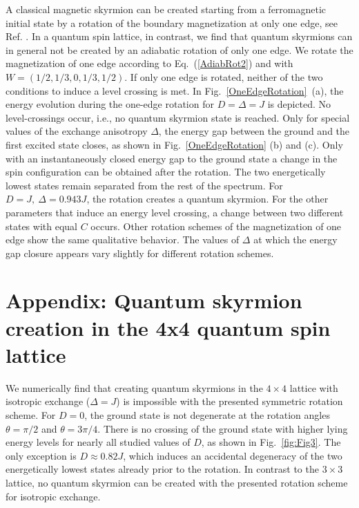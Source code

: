 \documentclass[reprint,aps,prb,superscriptaddress,10pt]{revtex4-2} %
\begin{document}
A classical magnetic skyrmion can be created starting from a ferromagnetic initial state by a rotation of the boundary magnetization at only one edge, see Ref. \cite{Schaffer2020}.  
In a quantum spin lattice, in contrast, we find that quantum skyrmions can in general not be created by an adiabatic rotation of only one edge. 
We rotate the magnetization of one edge according to Eq.~(\ref{AdiabRot2}) and with $W=(1/2,1/3,0,1/3,1/2)$. If only one edge is rotated, neither of the two conditions to induce a level crossing is met.
In Fig.~\ref{OneEdgeRotation}~(a), the energy evolution during the one-edge rotation for $D=\Delta=J$ is depicted. 
No level-crossings occur, i.e., no quantum skyrmion state is reached.
Only for special values of the exchange anisotropy $\Delta$, the energy gap between the ground and the first excited state closes, as shown in Fig.~\ref{OneEdgeRotation} (b) and (c). Only with an instantaneously closed energy gap to the ground state a change in the spin configuration can be obtained after the rotation. The two energetically lowest states remain separated from the rest of the spectrum.
For $D=J,~\Delta=0.943J$, the rotation creates a quantum skyrmion. For the other parameters that induce an energy level crossing, a change between two different states with equal $C$ occurs. 
Other rotation schemes of the magnetization of one edge show the same qualitative behavior. The values of $\Delta$ at which the energy gap closure appears vary slightly for different rotation schemes.
\section{Appendix: Quantum skyrmion creation in the 4x4 quantum spin lattice}\label{4x4Creation}
We numerically find that creating quantum skyrmions in the $4\times4$ lattice with isotropic exchange ($\Delta=J$) is impossible with the presented symmetric rotation scheme. For $D=0$, the ground state is not degenerate at the rotation angles $\theta=\pi/2$ and $\theta=3\pi/4$.
There is no crossing of the ground state with higher lying energy levels for nearly all studied values of $D$, as shown in Fig.~\ref{fig:Fig3}. The only exception is $D\approx0.82J$, which induces an accidental degeneracy of the two energetically lowest states already prior to the rotation.
In contrast to the $3\times3$ lattice, no quantum skyrmion can be created with the presented rotation scheme for isotropic exchange. 
\end{document}

